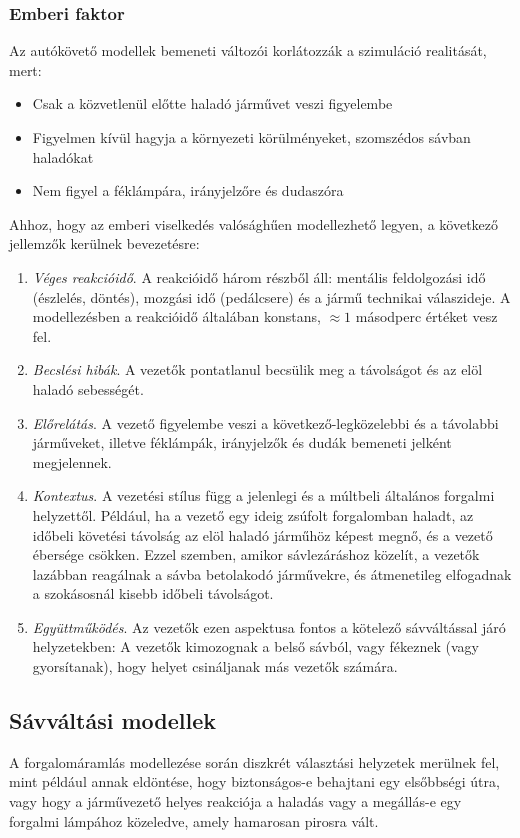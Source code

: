 \documentclass[14pt,a4paper]{extarticle}
\begin{document}
\subsubsection{Emberi faktor}
Az autókövető modellek bemeneti változói korlátozzák a szimuláció realitását, mert:
\begin{itemize}
	\item Csak a közvetlenül előtte haladó járművet veszi figyelembe
	\item Figyelmen kívül hagyja a környezeti körülményeket, szomszédos sávban haladókat
	\item Nem figyel a féklámpára, irányjelzőre és dudaszóra	
\end{itemize}
Ahhoz, hogy az emberi viselkedés valósághűen modellezhető legyen, a következő jellemzők kerülnek bevezetésre:
\begin{enumerate}
	\item \textit{Véges reakcióidő}. A reakcióidő három részből áll: mentális feldolgozási idő (észlelés, döntés), mozgási idő (pedálcsere) és a jármű technikai válaszideje. A modellezésben a reakcióidő általában konstans, $\approx 1$ másodperc értéket vesz fel.
	\item \textit{Becslési hibák}.  A vezetők pontatlanul becsülik meg a távolságot és az elöl haladó sebességét.
	\item \textit{Előrelátás}. A vezető figyelembe veszi a következő-legközelebbi és a távolabbi járműveket, illetve féklámpák, irányjelzők és dudák bemeneti jelként megjelennek.
	\item \textit{Kontextus}. A vezetési stílus függ a jelenlegi és a múltbeli általános forgalmi helyzettől. Például, ha a vezető egy ideig zsúfolt forgalomban haladt, az időbeli követési távolság az elöl haladó járműhöz képest megnő, és a vezető ébersége csökken. Ezzel szemben, amikor sávlezáráshoz közelít, a vezetők lazábban reagálnak a sávba betolakodó járművekre, és átmenetileg elfogadnak a szokásosnál kisebb időbeli távolságot.
	\item \textit{Együttműködés}. Az vezetők ezen aspektusa fontos a kötelező sávváltással járó helyzetekben: A vezetők kimozognak a belső sávból, vagy fékeznek (vagy gyorsítanak), hogy helyet csináljanak más vezetők számára.
\end{enumerate}
\subsection{Sávváltási modellek}
A forgalomáramlás modellezése során diszkrét választási helyzetek merülnek fel, mint például annak eldöntése, hogy biztonságos-e behajtani egy elsőbbségi útra, vagy hogy a járművezető helyes reakciója a haladás vagy a megállás-e egy forgalmi lámpához közeledve, amely hamarosan pirosra vált.
\end{document}

